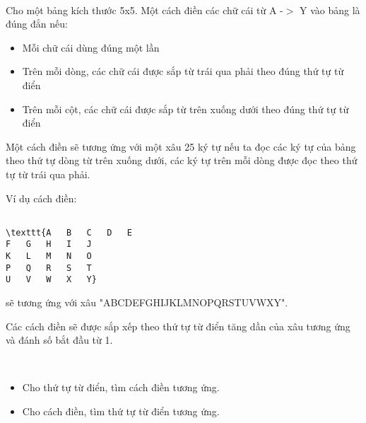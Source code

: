  

Cho một bảng kích thước 5x5. Một cách điền các chữ cái từ A -$>$ Y vào bảng là đúng đắn nếu:
\begin{itemize}
	\item Mỗi chữ cái dùng đúng một lần
	\item Trên mỗi dòng, các chữ cái được sắp từ trái qua phải theo đúng thứ tự từ điển
	\item Trên mỗi cột, các chữ cái được sắp từ trên xuống dưới theo đúng thứ tự từ điển
\end{itemize}

Một cách điền sẽ tương ứng với một xâu 25 ký tự nếu ta đọc các ký tự của bảng theo thứ tự dòng từ trên xuống dưới, các ký tự trên mỗi dòng được đọc theo thứ tự từ trái qua phải.

Ví dụ cách điền:
\begin{verbatim}

\texttt{A	B	C	D	E
F	G	H	I	J
K	L	M	N	O
P	Q	R	S	T
U	V	W	X	Y}\end{verbatim}

sẽ tương ứng với xâu "ABCDEFGHIJKLMNOPQRSTUVWXY".

Các cách điền sẽ được sắp xếp theo thứ tự từ điển tăng dần của xâu tương ứng và đánh số bắt đầu từ 1.

 

\begin{itemize}
	\item Cho thứ tự từ điển, tìm cách điền tương ứng.
	\item Cho cách điền, tìm thứ tự từ điển tương ứng.
\end{itemize}